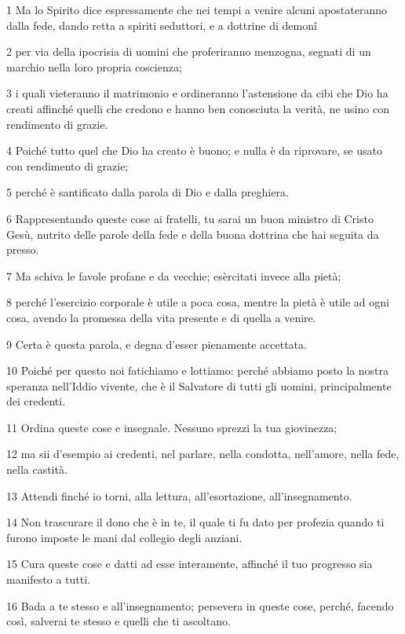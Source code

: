 \par 1 Ma lo Spirito dice espressamente che nei tempi a venire alcuni apostateranno dalla fede, dando retta a spiriti seduttori, e a dottrine di demonî
\par 2 per via della ipocrisia di uomini che proferiranno menzogna, segnati di un marchio nella loro propria coscienza;
\par 3 i quali vieteranno il matrimonio e ordineranno l'astensione da cibi che Dio ha creati affinché quelli che credono e hanno ben conosciuta la verità, ne usino con rendimento di grazie.
\par 4 Poiché tutto quel che Dio ha creato è buono; e nulla è da riprovare, se usato con rendimento di grazie;
\par 5 perché è santificato dalla parola di Dio e dalla preghiera.
\par 6 Rappresentando queste cose ai fratelli, tu sarai un buon ministro di Cristo Gesù, nutrito delle parole della fede e della buona dottrina che hai seguita da presso.
\par 7 Ma schiva le favole profane e da vecchie; esèrcitati invece alla pietà;
\par 8 perché l'esercizio corporale è utile a poca cosa, mentre la pietà è utile ad ogni cosa, avendo la promessa della vita presente e di quella a venire.
\par 9 Certa è questa parola, e degna d'esser pienamente accettata.
\par 10 Poiché per questo noi fatichiamo e lottiamo: perché abbiamo posto la nostra speranza nell'Iddio vivente, che è il Salvatore di tutti gli uomini, principalmente dei credenti.
\par 11 Ordina queste cose e insegnale. Nessuno sprezzi la tua giovinezza;
\par 12 ma sii d'esempio ai credenti, nel parlare, nella condotta, nell'amore, nella fede, nella castità.
\par 13 Attendi finché io torni, alla lettura, all'esortazione, all'insegnamento.
\par 14 Non trascurare il dono che è in te, il quale ti fu dato per profezia quando ti furono imposte le mani dal collegio degli anziani.
\par 15 Cura queste cose e datti ad esse interamente, affinché il tuo progresso sia manifesto a tutti.
\par 16 Bada a te stesso e all'insegnamento; persevera in queste cose, perché, facendo così, salverai te stesso e quelli che ti ascoltano.

